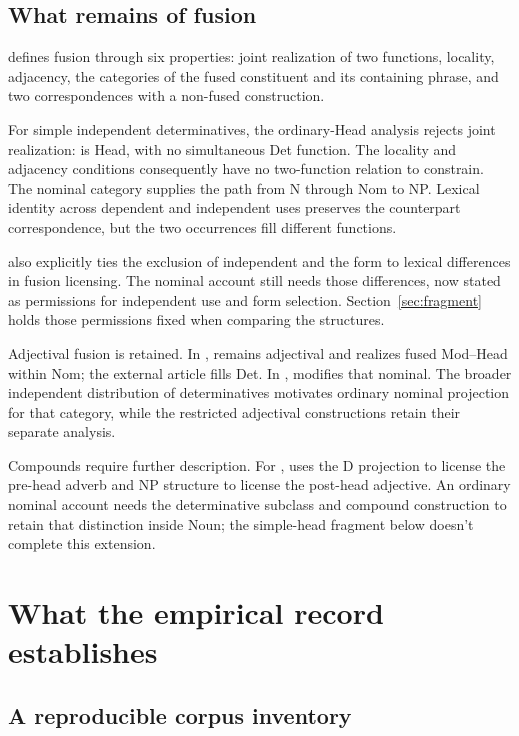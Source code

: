 \documentclass[12pt]{article}
\begin{document}
\subsection{What remains of fusion}

\textcite{Payne2007} defines fusion through six properties: joint realization of two functions, locality, adjacency, the categories of the fused constituent and its containing phrase, and two correspondences with a non-fused construction.

For simple independent determinatives, the ordinary-Head analysis rejects joint realization:  is Head, with no simultaneous Det function. The locality and adjacency conditions consequently have no two-function relation to constrain. The nominal category supplies the path from N through Nom to NP. Lexical identity across dependent and independent uses preserves the counterpart correspondence, but the two occurrences fill different functions.

\textcite{Payne2007} also explicitly ties the exclusion of independent  and the form  to lexical differences in fusion licensing. The nominal account still needs those differences, now stated as permissions for independent use and form selection. Section~\ref{sec:fragment} holds those permissions fixed when comparing the structures.

Adjectival fusion is retained. In ,  remains adjectival and realizes fused Mod--Head within Nom; the external article fills Det. In ,  modifies that nominal. The broader independent distribution of determinatives motivates ordinary nominal projection for that category, while the restricted adjectival constructions retain their separate analysis.

Compounds require further description. For , \textcite{Payne2007} uses the D projection to license the pre-head adverb and NP structure to license the post-head adjective. An ordinary nominal account needs the determinative subclass and compound construction to retain that distinction inside Noun; the simple-head fragment below doesn't complete this extension.

\section{What the empirical record establishes}\label{sec:empirical}

\subsection{A reproducible corpus inventory}
\end{document}
